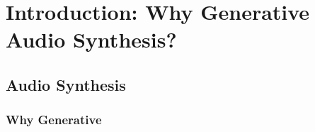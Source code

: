 \chapter{Introduction: Why Generative Audio Synthesis?}
\label{chap:intro}

\section{Audio Synthesis}
\subsection{Why Generative}

